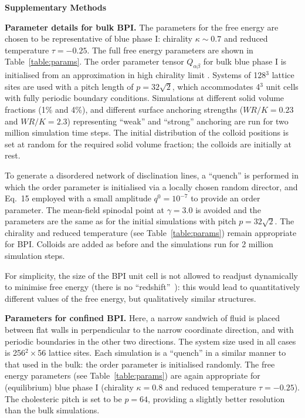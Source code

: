 \documentclass[12pt,twoside]{article}
\begin{document}
\vfill
\pagebreak

{\bf Supplementary Methods}

\noindent
\textbf{Parameter details for bulk BPI.}
The parameters for the free energy are chosen to be representative
of blue phase I: chirality $\kappa \sim 0.7$ and reduced temperature
$\tau = -0.25$.
The full free energy parameters are shown in Table~\ref{table:params}.
The order parameter tensor $Q_{\alpha\beta}$ for bulk blue phase I is
initialised from an approximation in high chirality limit
\cite{blue1,oliver1}. Systems of 128$^3$ lattice sites are
used with a pitch length of $p = 32\sqrt{2}$, which accommodates 4$^3$
unit cells with fully periodic boundary conditions.
Simulations at different solid volume fractions (1\% and 4\%), and different 
surface anchoring strengths ($WR/K = 0.23$ and $WR/K = 2.3$) representing
``weak'' and ``strong'' anchoring are run for two million simulation
time steps.
The initial distribution of the colloid positions is set at random
for the required solid volume fraction; the colloids are initially
at rest.

To generate a disordered network of disclination lines, a ``quench''
is performed in which the order parameter is initialised via a
locally chosen random director, and
Eq.~15
employed with a small amplitude $q^0 = 10^{-7}$ to
provide an order parameter.
The mean-field spinodal point at $\gamma = 3.0$ is avoided and
the parameters are the same as for the initial simulations with
pitch $p = 32\sqrt{2}$. The chirality and reduced temperature (see
Table~\ref{table:params}) remain appropriate for BPI.
Colloids are added as before and the simulations run for 2 million
simulation steps.

For simplicity,  the size of the BPI unit cell is not allowed to 
readjust dynamically to minimise free energy (there is no 
``redshift''~\cite{blue1}): this would lead to quantitatively different 
values of the free energy, but qualitatively similar structures. 

\noindent
\textbf{Parameters for confined BPI.}
Here, a narrow sandwich of fluid is placed between flat walls in
perpendicular to the narrow coordinate direction, and with periodic
boundaries in the other two directions. The system size used in all
cases is 256$^2 \times$56 lattice sites. Each simulation is a ``quench''
in a similar manner to that used in the bulk: the order parameter is
initialised randomly. The free energy parameters (see Table~\ref{table:params})
are again appropriate for (equilibrium) blue phase I
(chirality $\kappa = 0.8$ and
reduced temperature $\tau = -0.25$). The cholesteric pitch is set
to be $p = 64$, providing a slightly better resolution than the bulk
simulations.
\end{document}
